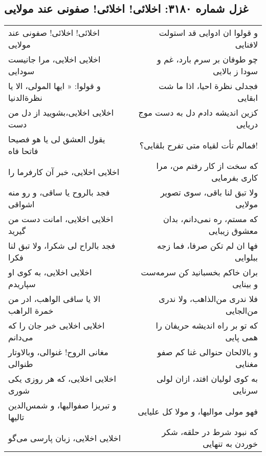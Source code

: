 \begin{center}
\section*{غزل شماره ۳۱۸۰: اخلائی! اخلائی! صفونی عند مولایی}
\label{sec:3180}
\begin{longtable}{l p{0.5cm} r}
اخلائی! اخلائی! صفونی عند مولایی
&&
و قولوا ان ادوایی قد استولت لافنایی
\\
اخلایی اخلایی، مرا جانیست سودایی
&&
چو طوفان بر سرم بارد، غم و سودا ز بالایی
\\
و قولوا: « ایها المولی، الا یا نظرةالدنیا
&&
فجدلی نظرة احیا، اذا ما شت ابقایی
\\
اخلایی اخلایی،بشویید از دل من دست
&&
کزین اندیشه دادم دل به دست موج دریایی
\\
یقول العشق لی یا هو فصیحا فاتحا فاه
&&
فمالم تأت لقیاه متی تفرح بلقایی؟!
\\
اخلایی اخلایی، خبر آن کارفرما را
&&
که سخت از کار رفتم من، مرا کاری بفرمایی
\\
فجد بالروح یا ساقی، و رو منه اشواقی
&&
ولا تبق لنا باقی، سوی تصویر مولایی
\\
اخلایی اخلایی، امانت دست من گیرید
&&
که مستم، ره نمی‌دانم، بدان معشوق زیبایی
\\
فجد بالراح لی شکرا، ولا تبق لنا فکرا
&&
فها ان لم تکن صرفا، فما زجه ببلوایی
\\
اخلایی اخلایی، به کوی او سپاریدم
&&
بران خاکم بخسبانید کن سرمه‌ست و بینایی
\\
الا یا ساقی الواهب، ادر من خمرة الراهب
&&
فلا ندری من‌الذاهب، ولا ندری من‌الجایی
\\
اخلایی اخلایی خبر جان را که می‌دانم
&&
که تو بر راه اندیشه حریفان را همی پایی
\\
مغانی الروح! غنوالی، وبالاوتار طنوالی
&&
و بالالحان حنوالی غنا کم صفو مغنایی
\\
اخلایی اخلایی، که هر روزی یکی شوری
&&
به کوی لولیان افتد، ازان لولی سرنایی
\\
و تبریزا صفوالیها، و شمس‌الدین تالیها
&&
فهو مولی موالیها، و مولا کل علیایی
\\
اخلایی اخلایی، زبان پارسی می‌گو
&&
که نبود شرط در حلقه، شکر خوردن به تنهایی
\\
\end{longtable}
\end{center}
